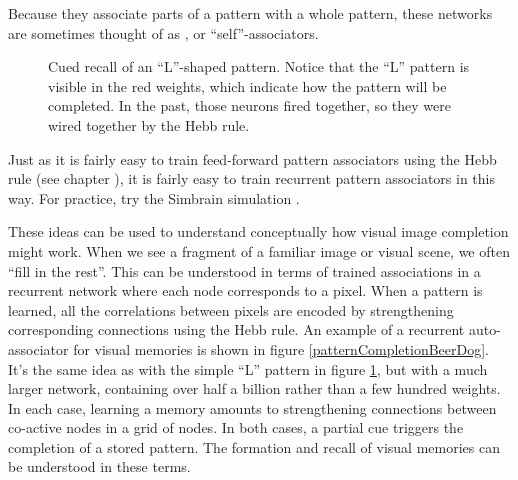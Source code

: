 Because they associate parts of a pattern with a whole pattern, these networks are sometimes thought of as , or ``self''-associators.

\begin{figure}[h]
\centering
{}
\caption[Simbrain screenshot.]{Cued recall of an ``L''-shaped pattern. Notice that the ``L'' pattern is visible in the red weights, which indicate how the pattern will be completed. In the past, those neurons fired together, so they were wired together by the Hebb rule.}
\label{patternCompletionL}
\end{figure}

Just as it is fairly easy to train feed-forward pattern associators using the Hebb rule (see chapter ), it is fairly easy to train recurrent pattern associators in this way.  For practice, try the Simbrain simulation .

These ideas can be used to understand conceptually how visual image completion might work. When we see a fragment of a familiar image or visual scene, we often ``fill in the rest''. This can be understood in terms of trained associations in a recurrent network where each node corresponds to a pixel. When a pattern is learned, all the correlations between pixels are encoded by strengthening corresponding connections using the Hebb rule. An example of a recurrent auto-associator for visual memories is shown in figure \ref{patternCompletionBeerDog}. It's the same idea as with the simple ``L'' pattern in figure \ref{patternCompletionL}, but with a much larger network, containing over half a billion rather than a few hundred weights. In each case, learning a memory amounts to strengthening connections between co-active nodes in a grid of nodes. In both cases, a partial cue triggers the completion of a stored pattern. The formation and recall of visual memories can be understood in these terms.  

